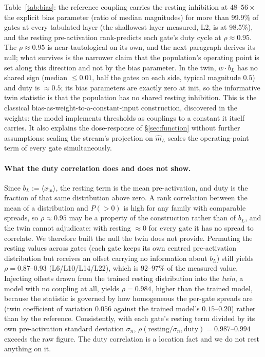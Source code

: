 \documentclass[11pt]{article}
\newcommand{\bl}{b_L}
\newcommand{\mhat}{\hat{m}}
\begin{document}
Table~\ref{tab:bias}: the reference coupling carries the resting
inhibition at $48$--$56\times$ the explicit bias parameter (ratio of
median magnitudes) for more than 99.9\% of gates at every tabulated layer
(the shallowest layer measured, L2, is at 98.5\%), and the resting
pre-activation rank-predicts each gate's duty cycle at
$\rho \approx 0.95$. The $\rho \approx 0.95$ is near-tautological
on its own, and the next paragraph derives its null; what survives is
the narrower claim that the population's operating point is set along
this direction and not by the bias parameter. In the twin,
$w\cdot\bl$ has no shared sign (median $\leq 0.01$, half the gates on
each side, typical magnitude $0.5$) and duty is $\approx 0.5$; its bias
parameters are exactly zero at init, so the informative twin statistic is
that the population has no shared resting inhibition. This is the
classical bias-as-weight-to-a-constant-input construction, discovered
in the weights: the model implements thresholds as couplings to a
constant it itself carries. It also explains the
dose-response of \S\ref{sec:function} without further assumptions:
scaling the stream's projection on $\mhat_L$ scales the operating-point
term of every gate simultaneously.

\paragraph{What the duty correlation does and does not show.} Since
$\bl := \langle x_{\text{ln}} \rangle$, the resting term is the
mean pre-activation, and duty is the fraction of that same
distribution above zero. A rank correlation between the mean of a
distribution and $P(>0)$ is high for any family with comparable
spreads, so $\rho \approx 0.95$ may be a property of the construction
rather than of $\bl$, and the twin cannot adjudicate: with resting
$\approx 0$ for every gate it has no spread to correlate. We therefore
built the null the twin does not provide. Permuting the resting values across gates (each gate keeps its own centred pre-activation
distribution but receives an offset carrying no information about
$\bl$) still yields $\rho = 0.87$--$0.93$ (L6/L10/L14/L22), which is
$92$--$97\%$ of the measured value. Injecting offsets drawn from the
trained resting distribution into the \emph{twin}, a model with no
coupling at all, yields $\rho = 0.984$, higher than the trained model,
because the statistic is governed by how homogeneous the per-gate
spreads are (twin coefficient of variation $0.056$ against the trained
model's $0.15$--$0.20$) rather than by the reference. Consistently, with each gate's resting term divided by its own
pre-activation standard deviation $\sigma_n$,
$\rho(\text{resting}/\sigma_n, \text{duty}) = 0.987$--$0.994$ exceeds
the raw figure. The duty correlation is a location fact and we do not
rest anything on it.
\end{document}
